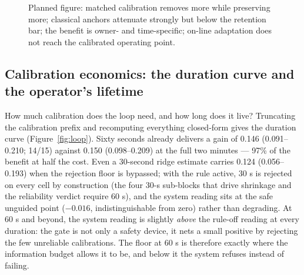 \begin{figure}[t]
  \centering
  \caption{Planned figure: matched calibration removes more while preserving more; classical anchors attenuate strongly but below the retention bar; the benefit is owner- and time-specific; on-line adaptation does not reach the calibrated operating point.}
  \label{fig:natural}
\end{figure}

\subsection{Calibration economics: the duration curve and the operator's lifetime}
\label{sec:res-loop}

How much calibration does the loop need, and how long does it live? Truncating the calibration prefix and recomputing everything closed-form gives the duration curve (Figure~\ref{fig:loop}). Sixty seconds already delivers a gain of 0.146 (0.091--0.210; 14/15) against 0.150 (0.098--0.209) at the full two minutes --- 97\% of the benefit at half the cost. Even a 30-second ridge estimate carries 0.124 (0.056--0.193) when the rejection floor is bypassed; with the rule active, 30 s is rejected on every cell by construction (the four 30-s sub-blocks that drive shrinkage and the reliability verdict require 60 s), and the system reading sits at the safe unguided point ($-0.016$, indistinguishable from zero) rather than degrading. At 60 s and beyond, the system reading is slightly \emph{above} the rule-off reading at every duration: the gate is not only a safety device, it nets a small positive by rejecting the few unreliable calibrations. The floor at 60 s is therefore exactly where the information budget allows it to be, and below it the system refuses instead of failing.

